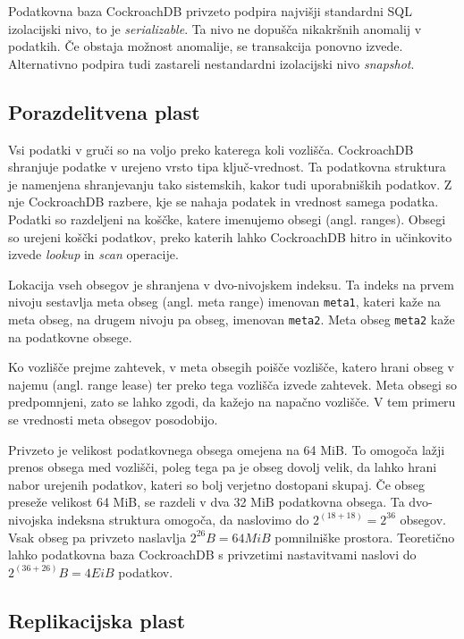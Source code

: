\documentclass[a4paper, 12pt]{book}
\begin{document}
Podatkovna baza CockroachDB privzeto podpira najvišji standardni SQL izolacijski nivo, to je \textit{serializable}. Ta nivo ne dopušča nikakršnih anomalij v podatkih. Če obstaja možnost anomalije, se transakcija ponovno izvede. Alternativno podpira tudi zastareli nestandardni izolacijski nivo \textit{snapshot}.

    
\subsection{Porazdelitvena plast}

Vsi podatki v gruči so na voljo preko katerega koli vozlišča. CockroachDB shranjuje podatke v urejeno vrsto tipa ključ-vrednost. Ta podatkovna stru\-ktu\-ra je namenjena shranjevanju tako sistemskih, kakor tudi uporabniških podatkov. Z nje CockroachDB razbere, kje se nahaja podatek in vrednost samega podatka. Podatki so razdeljeni na koščke, katere imenujemo obsegi (angl. ranges). Obsegi so urejeni koščki podatkov, preko katerih lahko CockroachDB hitro in učinkovito izvede \textit{lookup} in \textit{scan} operacije.

Lokacija vseh obsegov je shranjena v dvo-nivojskem indeksu. Ta indeks na prvem nivoju sestavlja meta obseg (angl. meta range) imenovan \texttt{meta1}, kateri kaže na meta obseg, na drugem nivoju pa obseg, imenovan \texttt{meta2}. Meta obseg \texttt{meta2} kaže na podatkovne obsege.

Ko vozlišče prejme zahtevek, v meta obsegih poišče vozlišče, katero hrani obseg v najemu (angl. range lease) ter preko tega vozlišča izvede zahtevek. Meta obsegi so predpomnjeni, zato se lahko zgodi, da kažejo na napačno vozlišče. V tem primeru se vrednosti meta obsegov posodobijo.

Privzeto je velikost podatkovnega obsega omejena na 64 MiB. To omogoča lažji prenos obsega med vozlišči, poleg tega pa je obseg dovolj velik, da lahko hrani nabor urejenih podatkov, kateri so bolj verjetno dostopani skupaj. Če obseg preseže velikost 64 MiB, se razdeli v dva 32 MiB podatkovna obsega. Ta dvo-nivojska indeksna struktura omogoča, da naslovimo do \(2^{(18 + 18)} = 2^{36}\) obsegov. Vsak obseg pa privzeto naslavlja \(2^{26}B = 64 MiB\) pomnilniške prostora. Teoretično lahko podatkovna baza CockroachDB s privzetimi nastavitvami naslovi do \(2^{(36+26)}B = 4 EiB\) podatkov. 

\subsection{Replikacijska plast}
\end{document}
